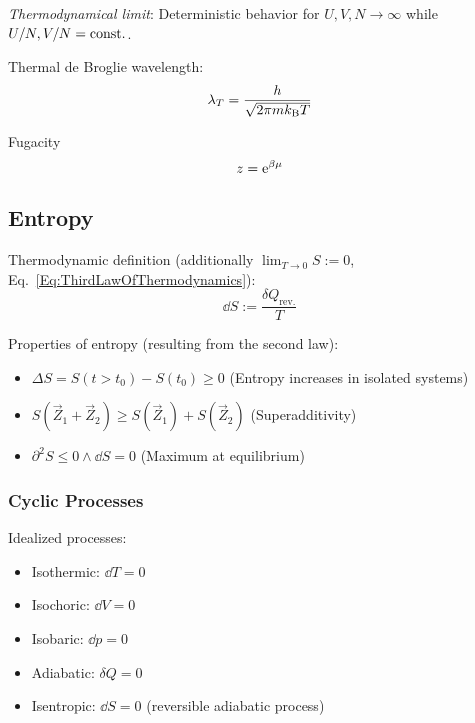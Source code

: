 		\emph{Thermodynamical limit}: \newline Deterministic behavior for $U,V,N \to \infty$ while $U/N,V/N=\mathrm{const.}$. \vsp

		\noindent
		Thermal de Broglie wavelength:
		\begin{equation}
			\label{Eq:ThermalDeBroglieWavelength}
			\lambda_T = \frac{h}{\sqrt{2\pi m k_{\text{B}} T}}
		\end{equation} \vsp

		\noindent
		Fugacity
		\begin{equation}
			z = \mathrm{e}^{\beta\mu}
		\end{equation} \vsp

	\subsection{Entropy}
		\noindent
		Thermodynamic definition (additionally $\lim_{T \to 0} S := 0$, Eq.~\ref{Eq:ThirdLawOfThermodynamics}):
		\begin{equation}
			\dd S := \frac{\delta Q_\text{rev.}}{T}
		\end{equation}

		\noindent
		Properties of entropy (resulting from the second law):
		\begin{itemize}\itemsep -0pt	%
			\item $\Delta S = S(t>t_0)-S(t_0) \ge 0$ \hfill{(Entropy increases in isolated systems)}
			\item $S(\vec{Z}_1 + \vec{Z}_2) \ge S(\vec{Z}_1) + S(\vec{Z}_2)$ \hfill{(Superadditivity)}
			\item $\partial^2 S \le 0 \wedge \dd{S} = 0$ \hfill{(Maximum at equilibrium)}
		\end{itemize}

		\subsubsection{Cyclic Processes}
			\noindent
			Idealized processes:
			\begin{itemize}
				\item Isothermic: $\dd T = 0$
				\item Isochoric: $\dd V = 0$
				\item Isobaric: $\dd p = 0$
				\item Adiabatic: $\delta Q = 0$
				\item Isentropic: $\dd S = 0$ (reversible adiabatic process)
			\end{itemize}

